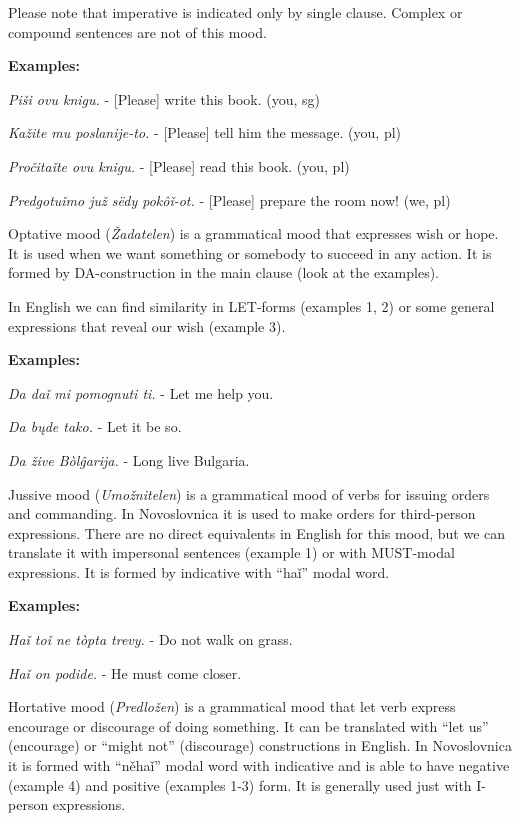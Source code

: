 Please note that imperative is indicated only by single clause. Complex or compound sentences are not of this mood.

\textbf{Examples:}

\textit{Piši ovu knigu.} - [Please] write this book. (you, sg)

\textit{Kažite mu poslanije-to.} - [Please] tell him the message. (you, pl)

\textit{Pročitaǐte ovu knigu.} - [Please] read this book. (you, pl)

\textit{Predgotuǐmo juž sëdy pokôǐ-ot.} - [Please] prepare the room now! (we, pl)

Optative mood (\textit{Žadatelen}) is a grammatical mood that expresses wish or hope. It is used when we want something or somebody to succeed in any action. It is formed by DA-construction in the main clause (look at the examples). 

In English we can find similarity in LET-forms (examples 1, 2) or some general expressions that reveal our wish (example 3).

\textbf{Examples:}

\textit{Da daǐ mi pomognuti ti.} - Let me help you.

\textit{Da bųde tako.} - Let it be so.

\textit{Da žive Bòlĝarija.} - Long live Bulgaria.

Jussive mood (\textit{Umožnitelen}) is a grammatical mood of verbs for issuing orders and commanding. In Novoslovnica it is used to make orders for third-person expressions. There are no direct equivalents in English for this mood, but we can translate it with impersonal sentences (example 1) or with MUST-modal expressions. It is formed by indicative with “haǐ” modal word.

\textbf{Examples:}

\textit{Haǐ toǐ ne tòpta trevy.} - Do not walk on grass.

\textit{Haǐ on podide.} - He must come closer.

Hortative mood (\textit{Predložen})  is a grammatical mood that let verb express encourage or discourage of doing something. It can be translated with “let us” (encourage) or “might not” (discourage) constructions in English. In Novoslovnica it is formed with “něhaǐ” modal word with indicative and is able to have negative (example 4) and positive (examples 1-3) form. It is generally used just with I-person expressions.

